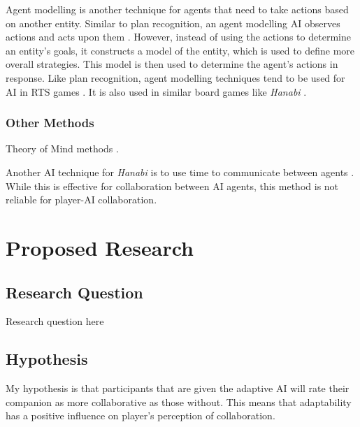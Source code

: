 \documentclass{IEEEtran}
\begin{document}
Agent modelling is another technique for agents that need to take actions based on another entity. Similar to plan recognition, an agent modelling AI observes actions and acts upon them \cite{yannakakis2013playermodelling}. However, instead of using the actions to determine an entity’s goals, it constructs a model of the entity, which is used to define more overall strategies. This model is then used to determine the agent's actions in response. Like plan recognition, agent modelling techniques tend to be used for AI in RTS games \cite{OpponentModellingRTS2007, bakkes2009opponentmodelling}. It is also used in similar board games like \textit{Hanabi} \cite{EvaluatingHanabiAgents}.

\subsubsection{Other Methods}
\label{OtherConsiderations}

Theory of Mind methods \cite{TheoryOfMind2013, von2017mindsofmany}.

Another AI technique for \textit{Hanabi} is to use time to communicate between agents \cite{WaitASecond2019}. While this is effective for collaboration between AI agents, this method is not reliable for player-AI collaboration.

\section{Proposed Research}
\label{ProposedResearch}

\subsection{Research Question}
\label{ResearchQuestion}

Research question here

\subsection{Hypothesis}
\label{Hypotheses}
My hypothesis is that participants that are given the adaptive AI will rate their companion as more collaborative as those without. This means that adaptability has a positive influence on player’s perception of collaboration.
\end{document}
